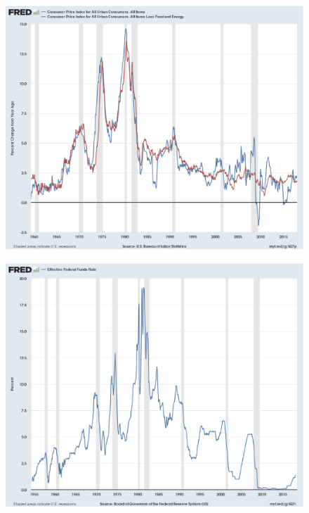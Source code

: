\documentclass{beamer}
\begin{document}
\begin{frame}
  \begin{figure}
    \includegraphics[scale=.25]{fred3.eps}
  \end{figure}
\end{frame}

\begin{frame}
  \begin{figure}
    \includegraphics[scale=.25]{fred4.eps}
  \end{figure}
\end{frame}
\end{document}
